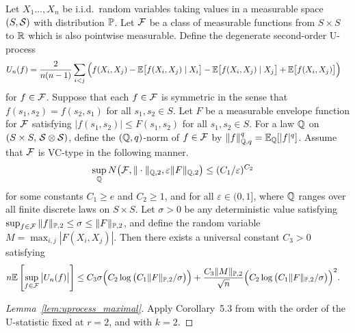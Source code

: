 \begin{lemma}
  \label{lem:uprocess_maximal}

  Let $X_1 \ldots, X_n$
  be i.i.d.\ random variables taking values
  in a measurable space $(S, \cS)$
  with distribution $\P$.
  Let $\cF$ be a class of measurable functions from
  $S \times S$ to $\R$ which is also pointwise measurable.
  Define the degenerate second-order U-process
  \begin{align*}
    U_n(f)
    &=
    \frac{2}{n(n-1)}
    \sum_{i<j}
    \Big(
    f(X_i, X_j)
    - \E\big[f(X_i,X_j) \mid X_i\big]
    - \E\big[f(X_i,X_j) \mid X_j\big]
    + \E\big[f(X_i,X_j)\big]
    \Big)
  \end{align*}
  for $f \in \cF$.
  Suppose that each $f \in \cF$ is symmetric in the sense that
  $f(s_1,s_2) = f(s_2,s_1)$
  for all $s_1, s_2 \in S$.
  Let $F$ be a measurable envelope function for $\cF$
  satisfying $|f(s_1,s_2)| \leq F(s_1,s_2)$
  for all $s_1,s_2 \in S$.
  For a law $\Q$ on
  $(S \times S, \, \cS \otimes \cS)$,
  define the $(\Q,q)$-norm of $f \in \cF$ by
  $\|f\|_{\Q,q}^q = \E_\Q[|f|^q]$.
  Assume that $\cF$ is VC-type in the following manner.
  \begin{align*}
    \sup_\Q
    N\big(
    \cF, \|\cdot\|_{\Q,2}, \varepsilon \|F\|_{\Q,2}
    \big)
    &\leq
    (C_1/\varepsilon)^{C_2}
  \end{align*}
  for some constants
  $C_1 \geq e$
  and
  $C_2 \geq 1$,
  and for all $\varepsilon \in (0,1]$,
  where $\Q$ ranges over all finite discrete laws
  on
  $S \times S$.
  Let $\sigma > 0$ be any deterministic value satisfying
  $\sup_{f \in \cF} \|f\|_{\P,2} \leq \sigma \leq \|F\|_{\P,2}$,
  and define the random variable $M = \max_{i,j} |F(X_i, X_j)|$.
  Then there exists a universal constant $C_3 > 0$
  satisfying
  \begin{align*}
    n
    \E\left[
      \sup_{f \in \cF}
      \big| U_n(f) \big|
    \right]
    &\leq
    C_3 \sigma
    \Big(
    C_2 \log\big(C_1 \|F\|_{\P,2} / \sigma \big)
    \Big)
    + \frac{C_3 \|M\|_{\P,2}}{\sqrt{n}}
    \Big(
    C_2 \log\big(C_1 \|F\|_{\P,2} / \sigma \big)
    \Big)^2.
  \end{align*}

\end{lemma}

\begin{proof}[Lemma~\ref{lem:uprocess_maximal}]

  Apply Corollary~5.3
  from \citet{chen2020jackknife}
  with the order of the U-statistic fixed at
  $r=2$,
  and with $k=2$.
\end{proof}

